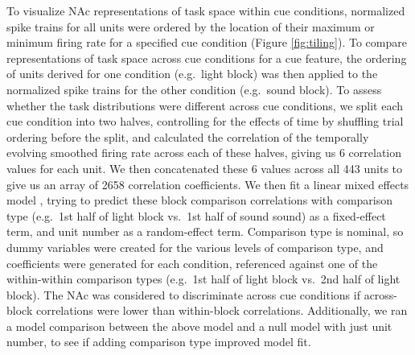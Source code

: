 \documentclass[11pt]{article}
\providecommand{\DIFadd}[1]{{\protect\color{red} \sf #1}} %
\providecommand{\DIFdel}[1]{} %
\providecommand{\DIFaddbegin}{} %
\providecommand{\DIFaddend}{} %
\providecommand{\DIFdelbegin}{} %
\providecommand{\DIFdelend}{} %
\newcommand{\DIFscaledelfig}{0.5}
\newlength{\DIFdelgraphicswidth} %
\newlength{\DIFdelgraphicsheight} %
\newcommand{\DIFaddincludegraphics}[2][]{{\color{red}\fbox{\DIFOincludegraphics[#1]{#2}}}} %
\newcommand{\DIFdelincludegraphics}[2][]{%
\sbox{\DIFdelgraphicsbox}{\DIFOincludegraphics[#1]{#2}}%
\settoboxwidth{\DIFdelgraphicswidth}{\DIFdelgraphicsbox} %
\settoboxtotalheight{\DIFdelgraphicsheight}{\DIFdelgraphicsbox} %
\scalebox{\DIFscaledelfig}{%
\parbox[b]{\DIFdelgraphicswidth}{\usebox{\DIFdelgraphicsbox}\\[-\baselineskip] \rule{\DIFdelgraphicswidth}{0em}}\llap{\resizebox{\DIFdelgraphicswidth}{\DIFdelgraphicsheight}{%
\setlength{\unitlength}{\DIFdelgraphicswidth}%
\begin{picture}(1,1)%
\thicklines\linethickness{2pt} %
{\color[rgb]{1,0,0}\put(0,0){\framebox(1,1){}}}%
{\color[rgb]{1,0,0}\put(0,0){\line( 1,1){1}}}%
{\color[rgb]{1,0,0}\put(0,1){\line(1,-1){1}}}%
\end{picture}%
}\hspace*{3pt}}} %
} %
\DeclareRobustCommand{\DIFaddbegin}{\DIFOaddbegin \let\includegraphics\DIFaddincludegraphics} %
\DeclareRobustCommand{\DIFaddend}{\DIFOaddend \let\includegraphics\DIFOincludegraphics} %
\DeclareRobustCommand{\DIFdelbegin}{\DIFOdelbegin \let\includegraphics\DIFdelincludegraphics} %
\DeclareRobustCommand{\DIFdelend}{\DIFOaddend \let\includegraphics\DIFOincludegraphics} %
\begin{document}
\DIFdelend To visualize NAc representations of task space within cue conditions, normalized spike trains for all units were ordered by the location of their maximum or minimum firing rate for a specified cue condition (Figure \ref{fig:tiling}). To compare representations of task space across cue conditions for a cue feature, the ordering of units derived for one condition (e.g.\ light block) was then applied to the normalized spike trains for the other condition (e.g.\ sound block). \DIFdelbegin \DIFdel{For control comparisons within }\DIFdelend \DIFaddbegin \DIFadd{To assess whether the task distributions were different across }\DIFaddend cue conditions, \DIFdelbegin \DIFdel{half of the
trials for a condition were compared against the other half. To look
at the correlation of firing rates of all units within and across various cue conditions, trials for each cue condition for a unitwere
shuffled and divided into two averages, and averages within and across cue conditions were correlated. A }\DIFdelend \DIFaddbegin \DIFadd{we split each cue condition into two halves, controlling for the effects of time by shuffling trial ordering before the split, and calculated the correlation of the temporally evolving smoothed firing rate across each of these halves, giving us 6 correlation values for each unit. We then concatenated these 6 values across all 443 units to give us an array of 2658 correlation coefficients. We then fit a }\DIFaddend linear mixed effects model\DIFdelbegin \DIFdel{was run
for each cue conditionto determine if correlations of firing rates
within cue conditions were more similar than correlations across cue
conditions. }\DIFdelend \DIFaddbegin \DIFadd{, trying to predict these block comparison correlations with comparison type (e.g.\ 1st half of light block vs.\ 1st half of sound sound) as a fixed-effect term, and unit number as a random-effect term. Comparison type is nominal, so dummy variables were created for the various levels of comparison type, and coefficients were generated for each condition, referenced against one of the within-within comparison types (e.g.\ 1st half of light block vs.\ 2nd half of light block). The NAc was considered to discriminate across cue conditions if across-block correlations were lower than within-block correlations. Additionally, we ran a model comparison between the above model and a null model with just unit number, to see if adding comparison type improved model fit.
}\DIFaddend 
\end{document}
